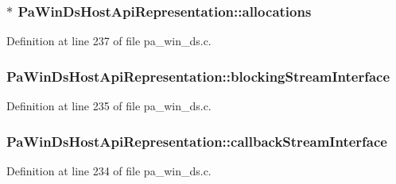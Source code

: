 \subsubsection[{\texorpdfstring{allocations}{allocations}}]{$\ast$ Pa\+Win\+Ds\+Host\+Api\+Representation\+::allocations}\hypertarget{struct_pa_win_ds_host_api_representation_aa68db0fc7c35453477148ab5f5cc4a19}{}\label{struct_pa_win_ds_host_api_representation_aa68db0fc7c35453477148ab5f5cc4a19}


Definition at line 237 of file pa\+\_\+win\+\_\+ds.\+c.

\subsubsection[{\texorpdfstring{blocking\+Stream\+Interface}{blockingStreamInterface}}]{ Pa\+Win\+Ds\+Host\+Api\+Representation\+::blocking\+Stream\+Interface}\hypertarget{struct_pa_win_ds_host_api_representation_aa15f24e9724e296be25e43ea955e9c0d}{}\label{struct_pa_win_ds_host_api_representation_aa15f24e9724e296be25e43ea955e9c0d}


Definition at line 235 of file pa\+\_\+win\+\_\+ds.\+c.

\subsubsection[{\texorpdfstring{callback\+Stream\+Interface}{callbackStreamInterface}}]{ Pa\+Win\+Ds\+Host\+Api\+Representation\+::callback\+Stream\+Interface}\hypertarget{struct_pa_win_ds_host_api_representation_aad9158766f315c2ac0c7e6a6ff01863f}{}\label{struct_pa_win_ds_host_api_representation_aad9158766f315c2ac0c7e6a6ff01863f}


Definition at line 234 of file pa\+\_\+win\+\_\+ds.\+c.

